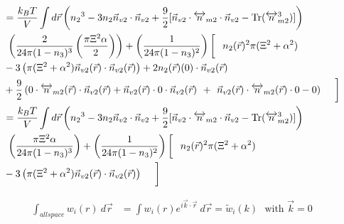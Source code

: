 \documentclass[double,12pt]{beavtex}
\begin{document}
\begin{align} %
%
&=\frac{k_BT}{V}\int d\vec r \left( {n_2}^3-3n_2
    \vec{n}_{v2}\cdot\vec{n}_{v2} 
     +\frac{9}{2}[\vec{n}_{v2}\cdot{\overleftrightarrow{n}_{m2}}\cdot{
     \vec{n}_{v2}}-\operatorname{Tr}({\overleftrightarrow{n}^3_{m2}})]
     \right) \nonumber\\
     &~\left(\frac{2}{24\pi(1-n_3)^3}\left(\frac{\pi\Xi^2\alpha}{2}\right)
     \right) + \left(\frac{1}{24\pi(1-n_3)^2}\right)\left[\color{white}
     \frac{1}{1}\color{black}n_2(\vec r)^2
     \pi(\Xi^2 + \alpha^2) \color{white}\right] \nonumber\\
     &- 3\left(\pi(\Xi^2 + \alpha^2)\vec n_{v2}
     (\vec r) \cdot \vec n_{v2}(\vec r)\right) + 2n_2(\vec r)(0)\cdot 
     \vec n_{v2}(\vec r)\nonumber \\
     &+\frac{9}{2}\left(0
     \cdot \overleftrightarrow n_{m2}(\vec r)\cdot \vec n_{v2}( \vec r)
     +\vec n_{v2}(\vec r)\cdot 0 \cdot \vec n_{v2}( \vec r)\color{white}
     \right)
     + \color{white}\left(\color{black}\vec n_{v2}( \vec r)\cdot 
     \overleftrightarrow n_{m2}(\vec r)
     \cdot 0-0\right) 
     \color{white}\left[\frac{1}{1}\color{black}\right] \\
%
&=\frac{k_BT}{V}\int d\vec r \left({n_2}^3-3n_2
   \vec{n}_{v2}\cdot\vec{n}_{v2} 
    +\frac{9}{2}[\vec{n}_{v2}\cdot{\overleftrightarrow{n}_{m2}}\cdot{
    \vec{n}_{v2}}-\operatorname{Tr}({\overleftrightarrow{n}^3_{m2}})]
    \right) \nonumber\\
    &~\left(\frac{\pi\Xi^2\alpha}{24\pi(1-n_3)^3}
    \right) + \left(\frac{1}{24\pi(1-n_3)^2}\right)\left[\color{white}
    \frac{1}{1}\color{black}n_2(\vec r)^2
    \pi(\Xi^2 + \alpha^2) \color{white}\right] \\
    &- 3\left(\pi(\Xi^2 + \alpha^2)\vec n_{v2}
    (\vec r) \cdot \vec n_{v2}(\vec r)\right) 
    \color{white}\left[\frac{1}{1}\color{black}\right]
\end{align}

\begin{align}
   \int_{all space} w_i(r) ~d\vec r &= \int w_i(r)e^{i\vec k \cdot 
   \vec r}~d\vec r 
    = \widetilde{w}_i(k) \mbox{~~with $\vec k = 0$}
\end{align}
\end{document}
